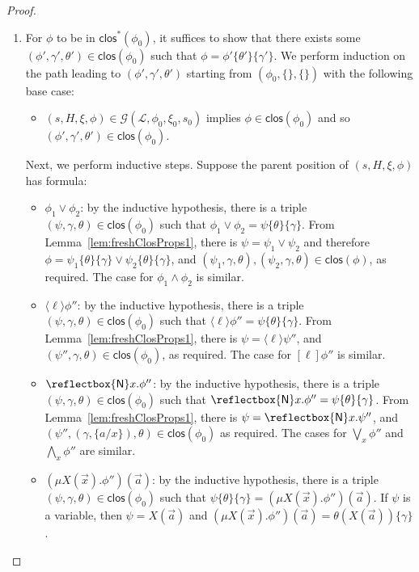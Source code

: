 \documentclass[10pt,a4paper]{article}
\theoremstyle{definition}
\theoremstyle{remark}
\newcommand\new[0]{\reflectbox{\ensuremath{\mathsf{N}}}}
\newcommand\fresh[1]{\new #1.}
\newcommand\diam[1]{\langle#1\rangle}
\newcommand\sq[1]{[#1]}
\newcommand\Gcal{\mathcal{G}}
\newcommand\Lcal{\mathcal{L}}
\newcommand{\clos}[0]{\mathsf{clos}}
\begin{document}
\begin{proof}
	\begin{enumerate}
				\item 
		For $\phi$ to be in $\clos^*(\phi_0)$, it suffices to show that there exists some $(\phi', \gamma', \theta') \in \clos(\phi_0)$ such that $\phi = \phi'\{\theta'\}\{\gamma'\}$. 
		We perform induction on the path leading to $(\phi', \gamma', \theta')$ starting from $(\phi_0, \{\}, \{\})$ with the following base case:
		\begin{itemize}
			\item $(s, H, \xi, \phi) \in \Gcal(\Lcal, \phi_0,\xi_0, s_0)$ implies $\phi \in \clos(\phi_0)$ and so $(\phi', \gamma', \theta') \in \clos(\phi_0)$.
		\end{itemize}
		Next, we perform inductive steps. Suppose the parent position of $(s, H,\xi,\phi)$ has formula:
		\begin{itemize}
			\item $\phi_1 \lor \phi_2$: by the inductive hypothesis, there is a triple $(\psi,\gamma,\theta)\in\clos(\phi_0)$ such that $\phi_1\lor\phi_2=\psi\{\theta\}\{\gamma\}$. From Lemma~\ref{lem:freshClosProps1}, there is $\psi=\psi_1\lor\psi_2$ and therefore $\phi=\psi_1\{\theta\}\{\gamma\}\lor\psi_2\{\theta\}\{\gamma\}$, and $(\psi_1,\gamma,\theta),(\psi_2,\gamma,\theta)\in\clos(\phi)$, as required. The case for  $\phi_1 \land \phi_2$ is similar.
						\item $\diam{\ell}\phi''$: 
			by the inductive hypothesis, there is a triple $(\psi,\gamma, \theta)\in\clos(\phi_0)$ such that $\diam{\ell}\phi''=\psi\{\theta\}\{\gamma\}$.
			From Lemma~\ref{lem:freshClosProps1}, there is $\psi=\diam{\ell}\psi''$, and $(\psi'', \gamma,\theta)\in \clos(\phi_0)$, as required. 
			The case for $\sq{\ell}\phi''$ is similar.
						\item $\fresh{x}\phi''$:
			by the inductive hypothesis, there is a triple $(\psi, \gamma, \theta) \in \clos(\phi_0)$ such that $\fresh{x}\phi''=\psi\{\theta\}\{\gamma\}$.
			From Lemma~\ref{lem:freshClosProps1}, there is $\psi=\fresh{x}\psi''$, and $(\psi'', (\gamma, \{a/x\}), \theta) \in \clos(\phi_0)$ as required.
			The cases for $\bigvee_x \phi''$ and $\bigwedge_x \phi''$ are similar. 
						\item $(\mu X(\vec x).\phi'')(\vec a)$: by the inductive hypothesis, there is a triple $(\psi, \gamma,\theta) \in \clos(\phi_0)$ such that $\psi\{\theta\}\{\gamma\} = (\mu X(\vec x).\phi'')(\vec a)$. 
			If $\psi$ is a variable, then $\psi = X(\vec a)$ and $(\mu X(\vec x).\phi'')(\vec a) = \theta(X(\vec a))\{\gamma\}$. 

\end{itemize}
\end{enumerate}
\end{proof}
\end{document}
